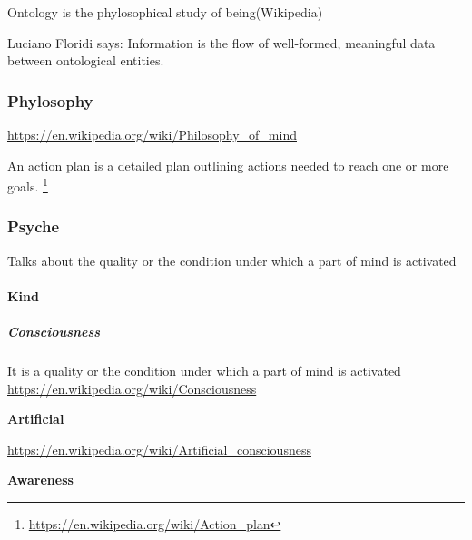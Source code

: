 \documentclass{book}
\providecommand{\ProjectDeepHeading}[2]{%
    \par\medskip\noindent\textbf{#2}\par\smallskip
}
\providecommand{\seeherefooter}[1]{\footnote{\url{#1}}}
\begin{document}

Ontology is the phylosophical study of being(Wikipedia)
        
        Luciano Floridi says:
        Information is the flow of well-formed, meaningful data between ontological entities.
        

\subsubsection{Phylosophy}


\url{https://en.wikipedia.org/wiki/Philosophy_of_mind}
    


An action plan is a detailed plan outlining actions needed to reach one or more goals. \seeherefooter{https://en.wikipedia.org/wiki/Action_plan}

\subsubsection{Psyche}


Talks about the quality or the condition under which a part of mind is activated

\paragraph{Kind}

\subparagraph{Consciousness}


It is a quality or the condition under which a part of mind is activated
    \url{https://en.wikipedia.org/wiki/Consciousness}

\ProjectDeepHeading{1}{Artificial}


\url{https://en.wikipedia.org/wiki/Artificial_consciousness}

\ProjectDeepHeading{1}{Awareness}

\end{document}
